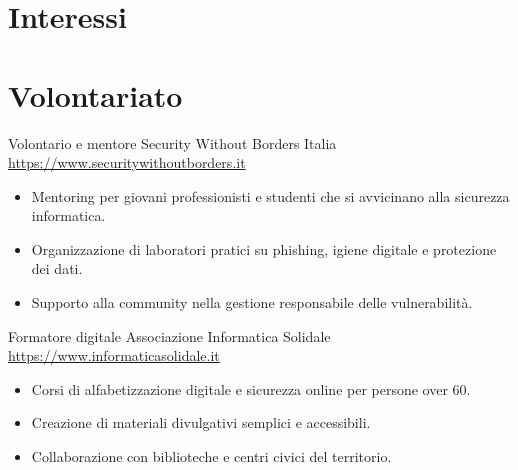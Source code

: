 \documentclass[a4paper, serif, 10pt]{moderncv}
\begin{document}
\section{Interessi}

\section{Volontariato}

        {Volontario e mentore}
        {Security Without Borders Italia}
        {\url{https://www.securitywithoutborders.it}}
        {}
        {\begin{itemize}
\item Mentoring per giovani professionisti e studenti che si avvicinano alla sicurezza informatica.
\item Organizzazione di laboratori pratici su phishing, igiene digitale e protezione dei dati.
\item Supporto alla community nella gestione responsabile delle vulnerabilità.
\end{itemize}}
    

        {Formatore digitale}
        {Associazione Informatica Solidale}
        {\url{https://www.informaticasolidale.it}}
        {}
        {\begin{itemize}
\item Corsi di alfabetizzazione digitale e sicurezza online per persone over 60.
\item Creazione di materiali divulgativi semplici e accessibili.
\item Collaborazione con biblioteche e centri civici del territorio.
\end{itemize}}
    
\end{document}
